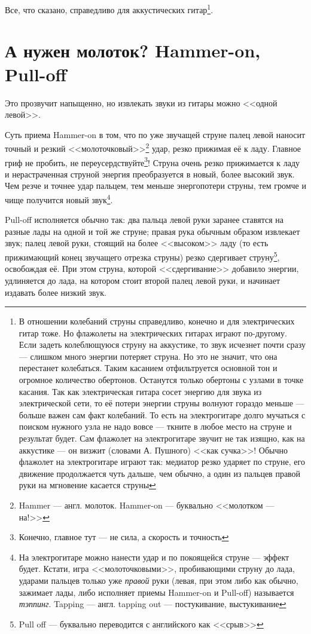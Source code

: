 Все, что сказано, справедливо для аккустических гитар\footnote{В отношении колебаний струны справедливо, конечно и для электрических гитар тоже. Но флажолеты на электрических гитарах играют по-другому. Если задеть колеблющуюся струну на аккустике, то звук исчезнет почти сразу --- слишком много энергии потеряет струна. Но это не значит, что она перестанет колебаться. Таким касанием отфильтруется основной тон и огромное количество обертонов. Останутся только обертоны с узлами в точке касания. Так как электрическая гитара сосет энергию для звука из электрической сети, то её потери энергии струны волнуют гораздо меньше --- больше важен сам факт колебаний. То есть на электрогитаре долго мучаться с поиском нужного узла не надо вовсе --- ткните в любое место на струне и результат будет. Сам флажолет на электрогитаре звучит не так изящно, как на аккустике --- он визжит (словами А. Пушного) <<как сучка>>! Обычно флажолет на электрогитаре играют так: медиатор резко ударяет по струне, его движение продолжается чуть дальше, чем обычно, а один из пальцев правой руки на мгновение касается струны}.


\section{А нужен молоток? Hammer-on, Pull-off}

Это прозвучит напыщенно, но извлекать звуки из гитары можно <<одной левой>>.

Суть приема Hammer-on в том, что по уже звучащей струне палец левой наносит точный и резкий <<молоточковый>>\footnote{Hammer --- англ. молоток. Hammer-on --- буквально <<молотком --- на!>>} удар, резко прижимая её к ладу. Главное гриф не пробить, не переусердствуйте\footnote{Конечно, главное тут --- не сила, а скорость и точность}! Струна очень резко прижимается к ладу и нерастраченная струной энергия преобразуется в новый, более высокий звук. Чем резче и точнее удар пальцем, тем меньше энергопотери струны, тем громче и чище получится новый звук\footnote{На электрогитаре можно нанести удар и по покоящейся струне --- эффект будет. Кстати, игра <<молоточковыми>>, пробивающими струну до лада, ударами пальцев только уже \emph{правой} руки (левая, при этом либо как обычно, зажимает лады, либо исполняет приемы Hammer-on и Pull-off) называется \emph{тэппинг}. Tapping --- англ. tapping out --- постукивание, выстукивание}.

Pull-off исполняется обычно так: два пальца левой руки заранее ставятся на разные лады на одной и той же струне; правая рука обычным образом извлекает звук; палец левой руки, стоящий на более <<высоком>> ладу (то есть прижимающий конец звучащего отрезка струны) резко сдергивает струну\footnote{Pull off --- буквально переводится с английского как <<срыв>>}, освобождая её. При этом струна, которой <<сдергивание>> добавило энергии, удлиняется до лада, на котором стоит второй палец левой руки, и начинает издавать более низкий звук.

